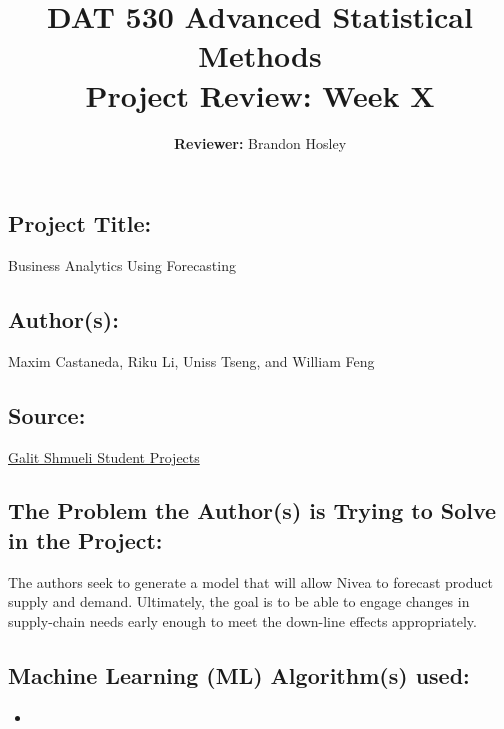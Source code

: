 \documentclass[]{article}
\title{\textbf{DAT 530 Advanced Statistical Methods}\\
	\normalsize{Project Review: Week X} }
\author{\textbf{Reviewer: }
	Brandon Hosley}
\begin{document}
\setlength{\droptitle}{-10em} 
\pretitle{\begin{flushleft}\LARGE} %
	\posttitle{\end{flushleft}}
\preauthor{\begin{flushleft}\large} %
	\postauthor{\end{flushleft}}
\predate{\begin{flushleft}\large} %
	\postdate{\end{flushleft}}
\maketitle

\vspace{-2em}

\subsection*{Project Title:}
Business Analytics Using Forecasting

\subsection*{Author(s):}
 Maxim Castaneda, Riku Li, Uniss Tseng, and William Feng

\subsection*{Source:}
\href{https://www.galitshmueli.com/data-mining-project/enhancing-supply-chain-efficiency-through-demand-forecasting-nivea}{Galit Shmueli Student Projects}

\subsection*{The Problem the Author(s) is Trying to Solve in the Project:}
The authors seek to generate a model that will allow Nivea to forecast product supply and demand. Ultimately, the goal is to be able to engage changes in supply-chain needs early enough to meet the down-line effects appropriately.

\subsection*{Machine Learning (ML) Algorithm(s) used:}
\begin{itemize}
	\item 
\end{itemize}
\end{document}
